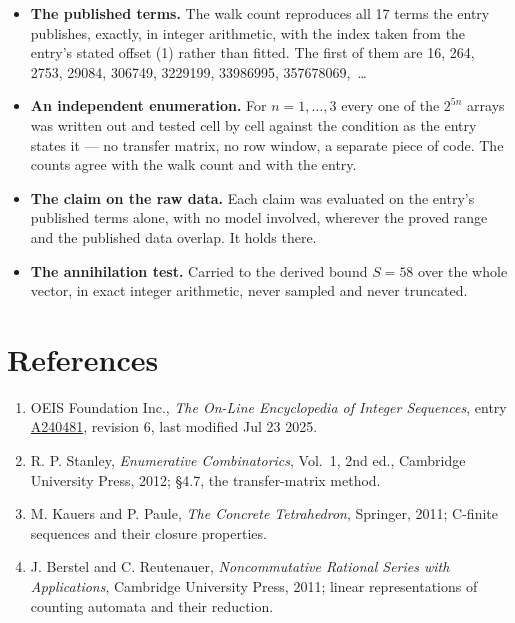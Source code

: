\documentclass[11pt]{article}
\theoremstyle{definition}
\begin{document}
\begin{itemize}

\item {\bfseries The published terms.} The walk count reproduces all 17 terms the entry publishes, exactly, in integer arithmetic, with the index taken from the entry's stated offset (1) rather than fitted. The first of them are 16, 264, 2753, 29084, 306749, 3229199, 33986995, 357678069,~\dots

\item {\bfseries An independent enumeration.} For $n = 1,\dots,3$ every one of the $2^{5n}$ arrays was written out and tested cell by cell against the condition as the entry states it --- no transfer matrix, no row window, a separate piece of code. The counts agree with the walk count and with the entry.

\item {\bfseries The claim on the raw data.} Each claim was evaluated on the entry's published terms alone, with no model involved, wherever the proved range and the published data overlap. It holds there.

\item {\bfseries The annihilation test.} Carried to the derived bound $S = 58$ over the whole vector, in exact integer arithmetic, never sampled and never truncated.

\end{itemize}

\section{References}

\begin{enumerate}

\item OEIS Foundation Inc., \emph{The On-Line Encyclopedia of Integer Sequences}, entry \href{https://oeis.org/A240481}{A240481}, revision 6, last modified Jul 23 2025.

\item R. P. Stanley, \emph{Enumerative Combinatorics}, Vol.~1, 2nd ed., Cambridge University Press, 2012; \S4.7, the transfer-matrix method.

\item M. Kauers and P. Paule, \emph{The Concrete Tetrahedron}, Springer, 2011; C-finite sequences and their closure properties.

\item J. Berstel and C. Reutenauer, \emph{Noncommutative Rational Series with Applications}, Cambridge University Press, 2011; linear representations of counting automata and their reduction.

\end{enumerate}
\end{document}
